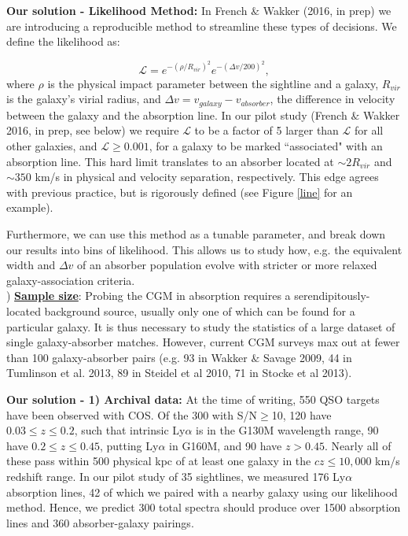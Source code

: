 \documentclass[12pt]{article}
\begin{document}
\textbf{Our solution - Likelihood Method: } In French $\&$ Wakker (2016, in prep) we are introducing a reproducible method to streamline these types of decisions. We define the likelihood as:

\begin{equation}
	\mathcal{L} = e^{-(\rho/R_{vir})^2} e^{-(\Delta v / 200)^2},
\end{equation}
where $\rho$ is the physical impact parameter between the sightline and a galaxy, $R_{vir}$ is the galaxy's virial radius, and $\Delta v = v_{galaxy} - v_{absorber}$, the difference in velocity between the galaxy and the absorption line. In our pilot study (French $\&$ Wakker 2016, in prep, see below) we require $\mathcal{L}$ to be a factor of 5 larger than $\mathcal{L}$ for all other galaxies, and $\mathcal{L} \geq 0.001$, for a galaxy to be marked ``associated" with an absorption line. This hard limit translates to an absorber located at $\sim 2 R_{vir}$ and $\sim 350$ km/s in physical and velocity separation, respectively. This edge agrees with previous practice, but is rigorously defined (see Figure \ref{line} for an example). 

Furthermore, we can use this method as a tunable parameter, and break down our results into bins of likelihood. This allows us to study how, e.g. the equivalent width and $\Delta v$ of an absorber population evolve with stricter or more relaxed galaxy-association criteria.\\


) \textbf{\underline{Sample size}}: Probing the CGM in absorption requires a serendipitously-located background source, usually only one of which can be found for a particular galaxy. It is thus necessary to study the statistics of a large dataset of single galaxy-absorber matches. However, current CGM surveys max out at fewer than 100 galaxy-absorber pairs (e.g. 93 in Wakker $\&$ Savage 2009, 44 in Tumlinson et al. 2013, 89 in Steidel et al 2010, 71 in Stocke et al 2013).

\textbf{Our solution - 1) Archival data:} At the time of writing, 550 QSO targets have been observed with COS. Of the 300 with S/N$\geq$10, 120 have $0.03\leq z \leq 0.2$, such that intrinsic Ly$\alpha$ is in the G130M wavelength range, 90 have $0.2\leq z \leq 0.45$, putting Ly$\alpha$ in G160M, and 90 have $z > 0.45$. Nearly all of these pass within 500 physical kpc of at least one galaxy in the $cz \leq 10,000$ km/s redshift range. In our pilot study of 35 sightlines, we measured 176 Ly$\alpha$ absorption lines, 42 of which we paired with a nearby galaxy using our likelihood method. Hence, we predict 300 total spectra should produce over 1500 absorption lines and 360 absorber-galaxy pairings.
\end{document}

